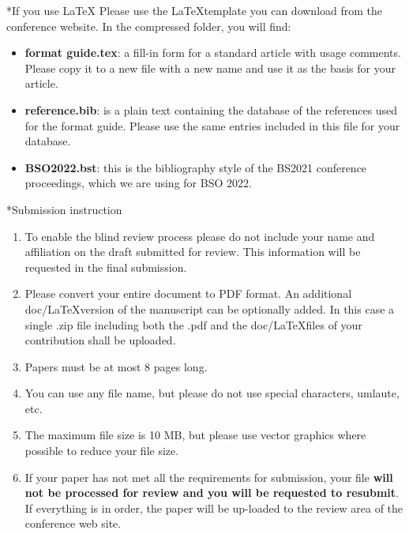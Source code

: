 \documentclass[twocolumn, a4paper,10pt]{article}
\makeatletter
\renewcommand\section{\@startsection{section}{1}{\z@}{3pt}{3pt}{\normalfont\large\bfseries}}
\makeatother
\begin{document}
\section*{If you use \LaTeX}
Please use the \LaTeX template you can download from the conference website. In the compressed folder, you will find:
\begin{itemize}
\item \textbf{format guide.tex}: a fill-in form for a standard article with usage comments. Please copy it to a new file with a new name and use it as the basis for your article.
\item \textbf{reference.bib}: is a plain text containing the database of the references used for the format guide. Please use the same entries included in this file for your database.
\item \textbf{BSO2022.bst}: this is the bibliography style of the BS2021 conference proceedings, which we are using for BSO 2022. 
\end{itemize}
\section*{Submission instruction}
\begin{enumerate}
    \item To enable the blind review process please do not include your name and affiliation on the draft submitted for review. This information will be requested in the final submission.
    \item Please convert your entire document to PDF format. An additional doc/\LaTeX version of the manuscript can be optionally added. In this case a single .zip file including both the .pdf and the doc/\LaTeX files of your contribution shall be uploaded.
    \item Papers must be at most 8 pages long.
    \item You can use any file name, but please do not use special characters, umlaute, etc.
    \item The maximum file size is 10 MB, but please use vector graphics where possible to reduce your file size.
		\item If your paper has not met all the requirements for submission, your file \textbf{will not be processed for review and you will be requested to resubmit}. If everything is in order, the paper will be up-loaded to the review area of the conference web site.
\end{enumerate}
\end{document}
